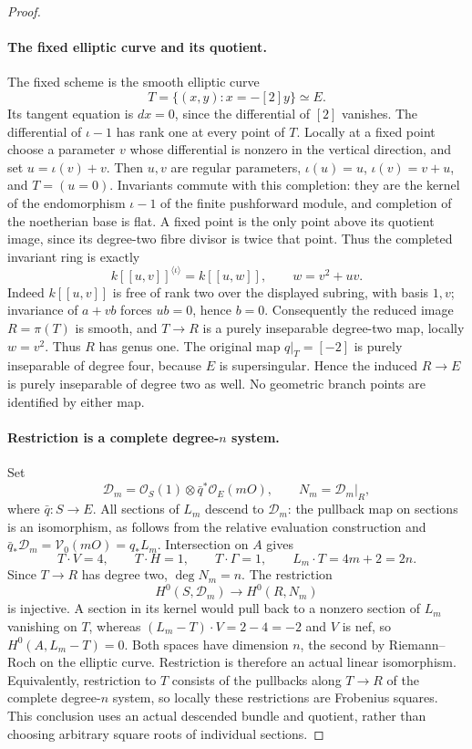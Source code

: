 \begin{proof}
\paragraph{The fixed elliptic curve and its quotient.}
The fixed scheme is the smooth elliptic curve
\[
                   T=\{(x,y):x=-[2]y\}\simeq E.
\]
Its tangent equation is \(dx=0\), since the differential of \([2]\)
vanishes. The differential of \(\iota-1\) has rank one at every
point of \(T\). Locally at a fixed point choose a parameter \(v\)
whose differential is nonzero in the vertical direction, and set
\(u=\iota(v)+v\). Then \(u,v\) are regular parameters,
\(\iota(u)=u\), \(\iota(v)=v+u\), and \(T=(u=0)\).
Invariants commute with this completion: they are the kernel
of the endomorphism \(\iota-1\) of the finite pushforward
module, and completion of the noetherian base is flat. A fixed
point is the only point above its quotient image, since its
degree-two fibre divisor is twice that point. Thus the completed
invariant ring is exactly
\[
 k[[u,v]]^{\langle\iota\rangle}
                  =k[[u,w]],\qquad w=v^2+uv.
\]
Indeed \(k[[u,v]]\) is free of rank two over the displayed
subring, with basis \(1,v\); invariance of \(a+vb\) forces
\(ub=0\), hence \(b=0\). Consequently the reduced image
\(R=\pi(T)\) is smooth, and \(T\to R\) is a purely inseparable
degree-two map, locally \(w=v^2\). Thus \(R\) has genus one.
The original map \(q|_T=[-2]\) is purely inseparable of degree four,
because \(E\) is supersingular. Hence the induced \(R\to E\)
is purely inseparable of degree two as well. No geometric branch
points are identified by either map.

\paragraph{Restriction is a complete degree-\(n\) system.}
Set
\[
 \mathcal D_m=\mathcal O_S(1)\otimes\bar q^*\mathcal O_E(mO),
 \qquad N_m=\mathcal D_m|_R,
\]
where \(\bar q:S\to E\). All sections of \(L_m\) descend to
\(\mathcal D_m\): the pullback map on sections is an isomorphism,
as follows from the relative evaluation construction and
\(\bar q_*\mathcal D_m=\mathcal V_0(mO)=q_*L_m\).
Intersection on \(A\) gives
\[
 T\cdot V=4,\qquad T\cdot H=1,\qquad T\cdot\Gamma=1,
 \qquad L_m\cdot T=4m+2=2n.
\]
Since \(T\to R\) has degree two, \(\deg N_m=n\).
The restriction
\[
          H^0(S,\mathcal D_m)\longrightarrow H^0(R,N_m)
\]
is injective. A section in its kernel would pull back to a
nonzero section of \(L_m\) vanishing on \(T\), whereas
\((L_m-T)\cdot V=2-4=-2\) and \(V\) is nef, so
\(H^0(A,L_m-T)=0\). Both spaces have dimension \(n\), the
second by Riemann--Roch on the elliptic curve. Restriction is
therefore an actual linear isomorphism. Equivalently, restriction
to \(T\) consists of the pullbacks along \(T\to R\) of the
complete degree-\(n\) system, so locally these restrictions are
Frobenius squares. This conclusion uses an actual descended
bundle and quotient, rather than choosing arbitrary square roots
of individual sections.


\end{proof}
